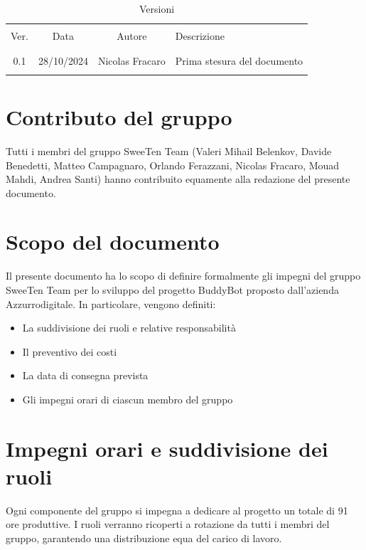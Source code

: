 \documentclass[italian, 12pt]{article}
\begin{document}
\pagestyle{mystyle}


\begin{table}[!h]
	\caption{Versioni}
	\begin{center}
		\begin{tabular}{ c c c p{9cm}}
			\hline \\[-2ex]
			Ver. & Data & Autore & Descrizione \\
			\\[-2ex] \hline \\[-1.5ex]
			0.1 & 28/10/2024 & Nicolas Fracaro& Prima stesura del documento\\
			\\[-1.5ex] \hline
		\end{tabular}
	\end{center}
\end{table}
\section*{Contributo del gruppo}
\noindent Tutti i membri del gruppo SweeTen Team (Valeri Mihail Belenkov, Davide Benedetti, Matteo Campagnaro, Orlando Ferazzani, Nicolas Fracaro, Mouad Mahdi, Andrea Santi) hanno contribuito equamente alla redazione del presente documento.
\newpage

\tableofcontents
\newpage


\section{Scopo del documento}
Il presente documento ha lo scopo di definire formalmente gli impegni del gruppo SweeTen Team per lo sviluppo del progetto BuddyBot proposto dall'azienda Azzurrodigitale. In particolare, vengono definiti:
\begin{itemize}
    \item La suddivisione dei ruoli e relative responsabilità
    \item Il preventivo dei costi
    \item La data di consegna prevista
    \item Gli impegni orari di ciascun membro del gruppo
\end{itemize}

\section{Impegni orari e suddivisione dei ruoli}
Ogni componente del gruppo si impegna a dedicare al progetto un totale di 91 ore produttive. I ruoli verranno ricoperti a rotazione da tutti i membri del gruppo, garantendo una distribuzione equa del carico di lavoro.
\end{document}
